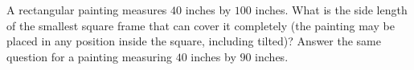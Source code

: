 A rectangular painting measures $40$ inches by $100$ inches. What is the side length of the smallest square frame that can cover it completely (the painting may be placed in any position inside the square, including tilted)? Answer the same question for a painting measuring $40$ inches by $90$ inches.
